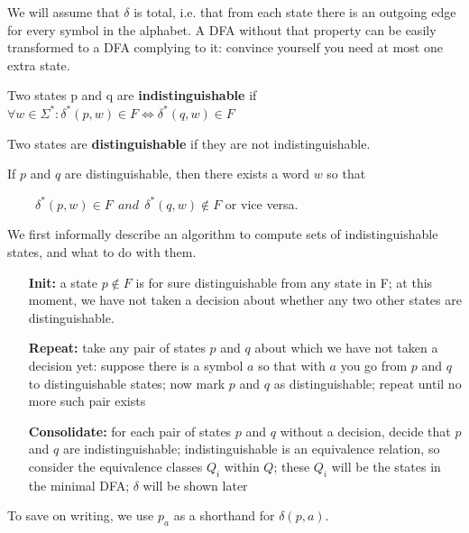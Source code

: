 We will assume that $\delta$ is total, i.e. that from each state there
is an outgoing edge for every symbol in the alphabet. A DFA without
that property can be easily transformed to a DFA complying to it:
convince yourself you need at most one extra state.

\begin{definition} \label{gelijk}
Two states p and q are {\bf indistinguishable} if
$\forall w \in \Sigma^*: \delta^*(p,w) \in F \Longleftrightarrow \delta^*(q,w) \in F$

Two states are {\bf distinguishable} if they are not indistinguishable.
\end{definition}

If $p$ and $q$ are distinguishable, then there exists a word $w$ so that

$~~~~~~~~~~\delta^*(p,w) \in F~~and~~ \delta^*(q,w) \notin F$ or vice versa.


We first informally describe an algorithm to compute sets of
indistinguishable states, and what to do with them.

\begin{itemize}
\item[{\bf Init:}]
a state $p \notin F$ is for sure distinguishable from any state in
F; at this moment, we have not taken a decision about whether any two other states are distinguishable.

\item[{\bf Repeat:}]
take any pair of states $p$ and $q$ about which we have not taken a
decision yet: suppose there is a symbol $a$ so that with $a$ you go
from $p$ and $q$ to distinguishable states; now mark $p$ and $q$ as
distinguishable; repeat until no more such pair exists

\item[{\bf Consolidate:}]
for each pair of states $p$ and $q$ without a decision, decide that
$p$ and $q$ are indistinguishable; indistinguishable is an equivalence
relation, so consider the equivalence classes $Q_i$ within $Q$; these
$Q_i$ will be the states in the minimal DFA; $\delta$ will be shown
later
\end{itemize}

To save on writing, we use $p_a$ as a shorthand for $\delta(p,a)$.



